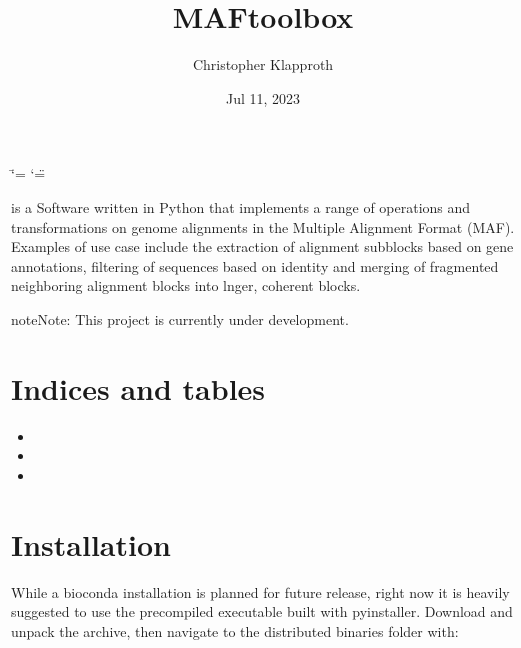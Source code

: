 \documentclass[letterpaper,10pt,english]{sphinxmanual}
\title{MAFtoolbox}
\date{Jul 11, 2023}
\author{Christopher Klapproth}
\begin{document}
\ifdefined\shorthandoff
  \ifnum\catcode`\=\string=\active\shorthandoff{=}\fi
  \ifnum\catcode`\"=\active{}\fi
\fi

\pagestyle{empty}
\sphinxmaketitle
\pagestyle{plain}
\sphinxtableofcontents
\pagestyle{normal}
\label{\detokenize{index::doc}}


\sphinxAtStartPar
{} is a Software written in Python that implements
a range of operations and transformations on genome alignments in the Multiple Alignment
Format (MAF). Examples of use case include the extraction of alignment subblocks
based on gene annotations, filtering of sequences based on identity and
merging of fragmented neighboring alignment blocks into lnger, coherent blocks.

\begin{sphinxadmonition}{note}{Note:}
\sphinxAtStartPar
This project is currently under development.
\end{sphinxadmonition}


\chapter{Indices and tables}
\label{\detokenize{index:indices-and-tables}}\begin{itemize}
\item {} 
\sphinxAtStartPar
{}

\item {} 
\sphinxAtStartPar
{}

\item {} 
\sphinxAtStartPar
{}

\end{itemize}


\chapter{Installation}
\label{\detokenize{index:installation}}
\sphinxAtStartPar
While a bioconda installation is planned for future release, right now it
is heavily suggested to use the precompiled executable built with pyinstaller.
Download and unpack the archive, then navigate to the distributed binaries folder with:

\begin{sphinxVerbatim}[commandchars=\\\{\}]
\end{sphinxVerbatim}
\end{document}
